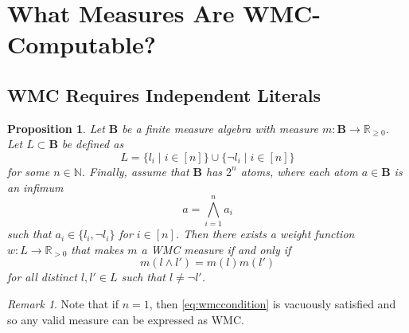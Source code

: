 \documentclass{article}
\newtheorem{proposition}{Proposition}
\theoremstyle{definition}
\theoremstyle{remark}
\newtheorem*{remark}{Remark}
\begin{document}

\section{What Measures Are WMC-Computable?}

\subsection{WMC Requires Independent Literals}


\begin{proposition}
  Let $\mathbf{B}$ be a finite measure algebra with measure $m\colon \mathbf{B} \to
  \mathbb{R}_{\ge 0}$. Let $L \subset \mathbf{B}$ be defined as
  \[
  L = \{ l_i \mid i \in [n] \} \cup \{ \neg l_i \mid i \in [n] \}
  \]
  for some $n \in \mathbb{N}$. Finally, assume that $\mathbf{B}$ has $2^n$
  atoms, where each atom $a \in \mathbf{B}$ is an infimum
  \[
    a = \bigwedge_{i=1}^n a_i
  \]
  such that $a_i \in \{ l_i, \neg l_i \}$ for $i \in [n]$. Then there exists a
  weight function $w\colon L \to \mathbb{R}_{>0}$ that makes $m$ a WMC measure if
  and only if
  \begin{equation} \label{eq:wmccondition}
  m(l \land l') = m(l)m(l')
  \end{equation}
  for all distinct $l, l' \in L$ such that $l \ne \neg l'$.
\end{proposition}

\begin{remark}
  Note that if $n = 1$, then \cref{eq:wmccondition} is vacuously satisfied and
  so any valid measure can be expressed as WMC.
\end{remark}
\end{document}

